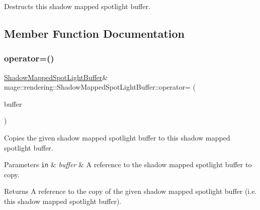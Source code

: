 Destructs this shadow mapped spotlight buffer. 

\subsection{Member Function Documentation}
\hypertarget{structmage_1_1rendering_1_1_shadow_mapped_spot_light_buffer_a2c209b2648740696d45113a152e648fb}{}\label{structmage_1_1rendering_1_1_shadow_mapped_spot_light_buffer_a2c209b2648740696d45113a152e648fb} 
\subsubsection{\texorpdfstring{operator=()}{operator=()}\hspace{0.1cm}{\footnotesize\ttfamily [1/2]}}
{\footnotesize\ttfamily \hyperlink{structmage_1_1rendering_1_1_shadow_mapped_spot_light_buffer}{Shadow\+Mapped\+Spot\+Light\+Buffer}\& mage\+::rendering\+::\+Shadow\+Mapped\+Spot\+Light\+Buffer\+::operator= (\begin{DoxyParamCaption}\item[{const \hyperlink{structmage_1_1rendering_1_1_shadow_mapped_spot_light_buffer}{Shadow\+Mapped\+Spot\+Light\+Buffer} \&}]{buffer }\end{DoxyParamCaption})\hspace{0.3cm}{\ttfamily [default]}}

Copies the given shadow mapped spotlight buffer to this shadow mapped spotlight buffer.


\begin{DoxyParams}[1]{Parameters}
\mbox{\tt in}  & {\em buffer} & A reference to the shadow mapped spotlight buffer to copy. \\
\hline
\end{DoxyParams}
\begin{DoxyReturn}{Returns}
A reference to the copy of the given shadow mapped spotlight buffer (i.\+e. this shadow mapped spotlight buffer). 
\end{DoxyReturn}
\hypertarget{structmage_1_1rendering_1_1_shadow_mapped_spot_light_buffer_ae2687b41af138b43fc814883310a877b}{}\label{structmage_1_1rendering_1_1_shadow_mapped_spot_light_buffer_ae2687b41af138b43fc814883310a877b} 

